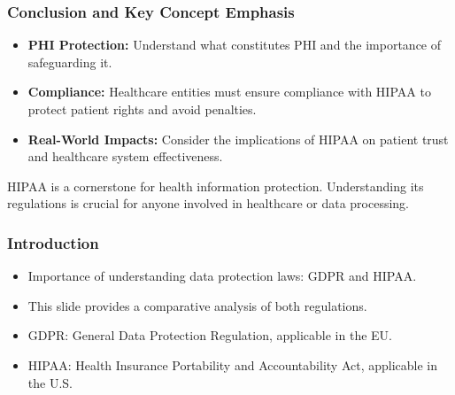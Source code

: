 \documentclass{beamer}
\begin{document}
\begin{frame}[fragile]
    \frametitle{Conclusion and Key Concept Emphasis}
    \begin{itemize}
        \item \textbf{PHI Protection:} Understand what constitutes PHI and the importance of 
        safeguarding it.
        
        \item \textbf{Compliance:} Healthcare entities must ensure compliance with HIPAA to protect 
        patient rights and avoid penalties.
        
        \item \textbf{Real-World Impacts:} Consider the implications of HIPAA on patient trust 
        and healthcare system effectiveness.
    \end{itemize}
    
    HIPAA is a cornerstone for health information protection. Understanding its regulations is crucial 
    for anyone involved in healthcare or data processing.
\end{frame}

\begin{frame}
    \titlepage
\end{frame}

\begin{frame}[fragile]
    \frametitle{Introduction}
    \begin{itemize}
        \item Importance of understanding data protection laws: GDPR and HIPAA.
        \item This slide provides a comparative analysis of both regulations.
        \item GDPR: General Data Protection Regulation, applicable in the EU.
        \item HIPAA: Health Insurance Portability and Accountability Act, applicable in the U.S.
    \end{itemize}
\end{frame}
\end{document}

